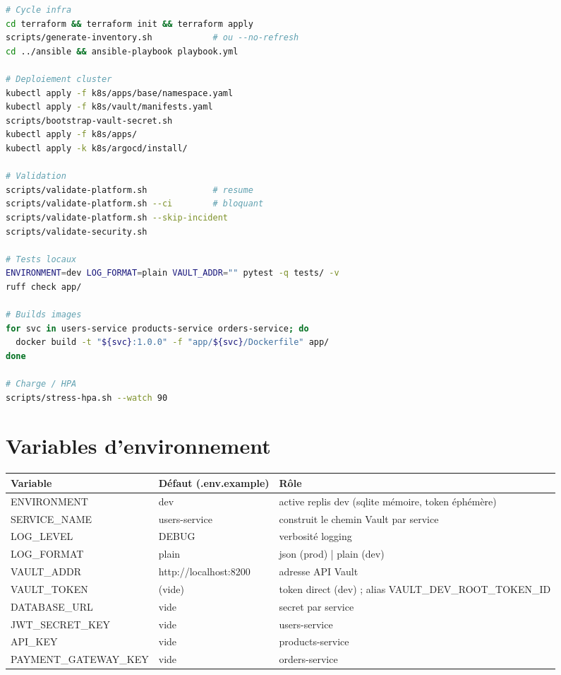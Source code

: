 \documentclass[12pt,a4paper,twoside,openright]{report}
\begin{document}
\begin{lstlisting}[language=bash,caption={Aide-mémoire d'exploitation quotidienne}]
# Cycle infra
cd terraform && terraform init && terraform apply
scripts/generate-inventory.sh            # ou --no-refresh
cd ../ansible && ansible-playbook playbook.yml

# Deploiement cluster
kubectl apply -f k8s/apps/base/namespace.yaml
kubectl apply -f k8s/vault/manifests.yaml
scripts/bootstrap-vault-secret.sh
kubectl apply -f k8s/apps/
kubectl apply -k k8s/argocd/install/

# Validation
scripts/validate-platform.sh             # resume
scripts/validate-platform.sh --ci        # bloquant
scripts/validate-platform.sh --skip-incident
scripts/validate-security.sh

# Tests locaux
ENVIRONMENT=dev LOG_FORMAT=plain VAULT_ADDR="" pytest -q tests/ -v
ruff check app/

# Builds images
for svc in users-service products-service orders-service; do
  docker build -t "${svc}:1.0.0" -f "app/${svc}/Dockerfile" app/
done

# Charge / HPA
scripts/stress-hpa.sh --watch 90
\end{lstlisting}

\chapter{Variables d'environnement}

\begin{center}\label{tab:an-variables-d-environnement}\end{center}
\begin{longtable}{@{}p{4.9cm}p{3.5cm}p{5.6cm}@{}}
\toprule
\textbf{Variable} & \textbf{Défaut (.env.example)} & \textbf{Rôle} \\
\midrule
\endhead
ENVIRONMENT & dev & active replis dev (sqlite mémoire, token éphémère) \\
SERVICE\_NAME & users-service & construit le chemin Vault par service \\
LOG\_LEVEL & DEBUG & verbosité logging \\
LOG\_FORMAT & plain & json (prod) | plain (dev) \\
VAULT\_ADDR & http://localhost:8200 & adresse API Vault \\
VAULT\_TOKEN & (vide) & token direct (dev) ; alias VAULT\_DEV\_\newline ROOT\_TOKEN\_ID \\
DATABASE\_URL & vide & secret par service \\
JWT\_SECRET\_KEY & vide & users-service \\
API\_KEY & vide & products-service \\
PAYMENT\_GATEWAY\_\newline KEY & vide & orders-service \\
\bottomrule
\end{longtable}
\end{document}
